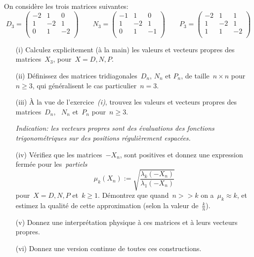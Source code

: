 \begin{exercice}
On considère les trois matrices suivantes:
\[
	D_3=\begin{pmatrix}
		-2 & 1 & 0 \\
		1 & -2 & 1 \\
		0 & 1 & -2 \\
	\end{pmatrix}
	\qquad
	N_3=\begin{pmatrix}
		-1 & 1 & 0 \\
		1 & -2 & 1 \\
		0 & 1 & -1 \\
	\end{pmatrix}
	\qquad
	P_3=\begin{pmatrix}
		-2 & 1 & 1 \\
		1 & -2 & 1 \\
		1 & 1 & -2 \\
	\end{pmatrix}
\]

\begin{itemize}
	\item[(i)]
Calculez explicitement (à la main) les valeurs et vecteurs propres des
matrices~$X_3$, pour~$X=D,N,P$.


	\item[(ii)]
Définissez des matrices tridiagonales~$D_n$, $N_n$ et $P_n$, de taille~$n\times
n$ pour~$n\ge 3$, qui généralisent le cas particulier~$n=3$.

	\item[(iii)]
		À la vue de l'exercice~{\sl(i)}, trouvez les valeurs et vecteurs propres des
matrices~$D_n$, ~$N_n$ et~$P_n$ pour~$n\ge 3$.

{\sl\color{gray} Indication: les vecteurs propres sont des évaluations des fonctions
trigonométriques sur des positions régulièrement espacées.}


	\item[(iv)]
Vérifiez que les matrices~$-X_n$, sont positives et donnez une
expression fermée pour les~\emph{partiels}
\[
	\mu_k(X_n) := \sqrt{\frac{\lambda_k(-X_n)}{\lambda_1(-X_n)}}
\]
pour~$X=D,N,P$ et~$k\ge 1$.  Démontrez que quand~$n>\!\!>k$ on a~$\mu_k\approx k$,
et estimez la qualité de cette approximation (selon la valeur de~$\tfrac kn$).

	\item[(v)]
Donnez une interprétation physique à ces matrices et à leurs vecteurs propres.

	\item[(vi)]
Donnez une version continue de toutes ces constructions.
\end{itemize}
\end{exercice}



